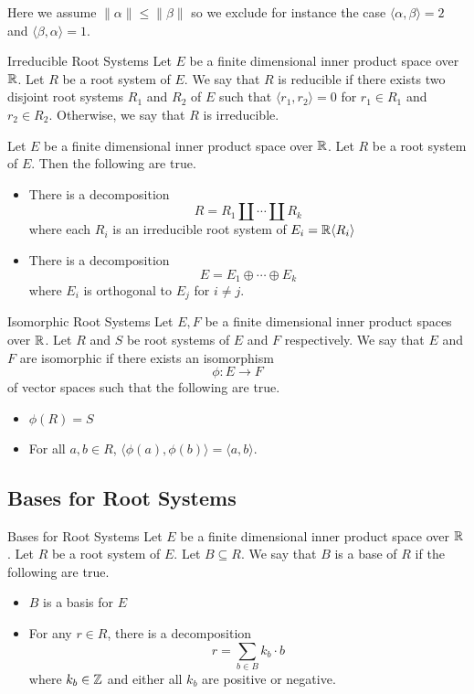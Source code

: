 \documentclass[a4paper]{article}
\begin{document}
Here we assume $\|\alpha\|\leq\|\beta\|$ so we exclude for instance the case $\langle\alpha,\beta\rangle=2$ and $\langle\beta,\alpha\rangle=1$. 

\begin{defn}{Irreducible Root Systems}{} Let $E$ be a finite dimensional inner product space over $\mathbb{R}$. Let $R$ be a root system of $E$. We say that $R$ is reducible if there exists two disjoint root systems $R_1$ and $R_2$ of $E$ such that $\langle r_1,r_2\rangle=0$ for $r_1\in R_1$ and $r_2\in R_2$. Otherwise, we say that $R$ is irreducible. 
\end{defn}

\begin{prp}{}{} Let $E$ be a finite dimensional inner product space over $\mathbb{R}$. Let $R$ be a root system of $E$. Then the following are true. 
\begin{itemize}
\item There is a decomposition $$R=R_1\amalg\cdots\amalg R_k$$ where each $R_i$ is an irreducible root system of $E_i=\mathbb{R}\langle R_i\rangle$
\item There is a decomposition $$E=E_1\oplus\cdots\oplus E_k$$ where $E_i$ is orthogonal to $E_j$ for $i\neq j$. 
\end{itemize}
\end{prp}

\begin{defn}{Isomorphic Root Systems}{} Let $E,F$ be a finite dimensional inner product spaces over $\mathbb{R}$. Let $R$ and $S$ be root systems of $E$ and $F$ respectively. We say that $E$ and $F$ are isomorphic if there exists an isomorphism $$\phi:E\to F$$ of vector spaces such that the following are true. 
\begin{itemize}
\item $\phi(R)=S$
\item For all $a,b\in R$, $\langle\phi(a),\phi(b)\rangle=\langle a,b\rangle$. 
\end{itemize}
\end{defn}

\subsection{Bases for Root Systems}
\begin{defn}{Bases for Root Systems}{} Let $E$ be a finite dimensional inner product space over $\mathbb{R}$. Let $R$ be a root system of $E$. Let $B\subseteq R$. We say that $B$ is a base of $R$ if the following are true. 
\begin{itemize}
\item $B$ is a basis for $E$
\item For any $r\in R$, there is a decomposition $$r=\sum_{b\in B}k_b\cdot b$$ where $k_b\in\mathbb{Z}$ and either all $k_b$ are positive or negative. 
\end{itemize}
\end{defn}
\end{document}
